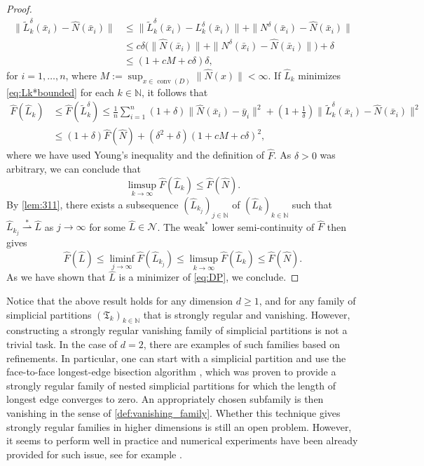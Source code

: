 \documentclass[onefignum,onetabnum]{siamonline250211}
\newcommand{\N}{\mathcal{N}}
\newcommand{\weakk}{\stackrel{\ast}{\rightharpoonup}}
\newcommand{\conv}{\operatorname{conv}}
\begin{document}
\begin{proof}
$$
\begin{aligned}
\|\widetilde{L}_k^\delta(\bar x_i)-\widehat{N}(\bar x_i)\|&\leq \|\widetilde{L}_k^\delta(\bar x_i)- L_k^\delta(\bar x_i)\|+\|N^\delta(\bar x_i)-\widehat{N}(\bar x_i)\|\\
&\leq c\delta \bigl( \| \widehat{N}(\bar x_i) \| + \|N^\delta(\bar x_i) - \widehat{N}(\bar x_i) \| \bigr) + \delta\\
&\leq (1+c M+c\delta)\delta, 
\end{aligned}
$$
for $i=1,\ldots, n$, where $M:= \sup_{x \in \conv(D)} \| \widehat{N}(x) \| < \infty$. If $\widehat{L}_k$ minimizes \cref{eq:Lk*bounded} for each $k\in\mathbb{N}$, it follows that
\begin{align*}
\widehat{F}(\widehat{L}_k)&\leq \widehat{F}(\widetilde{L}_k^\delta)\leq \frac1n\sum_{i=1}^n(1+\delta)\|\widehat{N}(\bar x_i)-\bar y_i\|^2+\left(1+\frac1\delta\right)\|\widetilde{L}_k^\delta(\bar x_i)-\widehat{N}(\bar x_i)\|^2\\
&\leq (1+\delta)\widehat{F}(\widehat{N})+\left(\delta^2+\delta\right)(1+c M+c\delta)^2,
\end{align*}
where we have used Young's inequality and the definition of $\widehat{F}$. As $\delta>0$ was arbitrary, we can conclude that
$$
\limsup_{k\to\infty} \widehat{F}(\widehat{L}_k)\leq \widehat{F}(\widehat{N}).
$$
By \cref{lem:311}, there exists a subsequence  $(\widehat{L}_{k_j})_{j\in\mathbb{N}}$ of $(\widehat{L}_k)_{k\in\mathbb{N}}$ such that $\widehat{L}_{k_j}\weakk \widehat{L}$ as $j\to\infty$ for some $\widehat{L} \in \N$. The weak$^*$ lower semi-continuity of $\widehat{F}$ then gives
$$
\widehat{F}(\widehat{L})\leq \liminf_{j\to\infty}\widehat{F}(\widehat{L}_{k_j})\leq \limsup_{k\to\infty}\widehat{F}(\widehat{L}_k)\leq \widehat{F}(\widehat{N}).
$$
As we have shown that $\widehat{L}$ is a minimizer of \cref{eq:DP}, we conclude.
\end{proof}

\begin{remark}\label{rem:simpart}
Notice that the above result holds for any dimension $d\geq 1$, and for any family of simplicial partitions $(\mathfrak{T}_k)_{k\in \mathbb{N}}$ that is strongly regular and vanishing. However, constructing a strongly regular vanishing family of simplicial partitions is not a trivial task. In the case of $d=2$, there are examples of such families based on refinements. In particular, one can start with a simplicial partition and use the face-to-face longest-edge bisection algorithm \cite{krizek}, which was proven to provide a strongly regular family of nested simplicial partitions for which the length of longest edge converges to zero. An appropriately chosen subfamily is then vanishing in the sense of \cref{def:vanishing_family}. Whether this technique gives strongly regular families in higher dimensions is still an open problem. However, it seems to perform well in practice and numerical experiments have been already provided for such issue, see for example \cite{hannu2014}. 
\end{remark}
\end{document}
